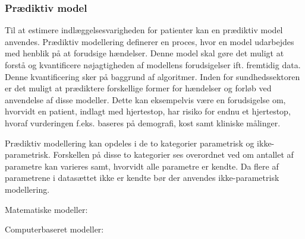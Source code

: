 \subsubsection{Prædiktiv model}
\noindent
Til at estimere indlæggelsesvarigheden for patienter kan en prædiktiv model anvendes.
Prædiktiv modellering definerer en proces, hvor en model udarbejdes med henblik på at forudsige hændelser. Denne model skal gøre det muligt at forstå og kvantificere nøjagtigheden af modellens forudsigelser ift. fremtidig data.\cite{Kuhn2013} Denne kvantificering sker på baggrund af algoritmer. 
Inden for sundhedssektoren er det muligt at prædiktere forskellige former for hændelser og forløb ved anvendelse af disse modeller. Dette kan eksempelvis være en forudsigelse om, hvorvidt en patient, indlagt med hjertestop, har risiko for endnu et hjertestop, hvoraf vurderingen f.eks. baseres på demografi, kost samt kliniske målinger\cite{Hastie2008}. %

\noindent
Prædiktiv modellering kan opdeles i de to kategorier parametrisk og ikke-parametrisk. Forskellen på disse to kategorier ses overordnet ved om antallet af parametre kan varieres samt, hvorvidt alle parametre er kendte. Da flere af parametrene i datasættet ikke er kendte bør der anvendes ikke-parametrisk modellering.\cite{Sheskin2000}

\noindent

Matematiske modeller:

Computerbaseret modeller: 